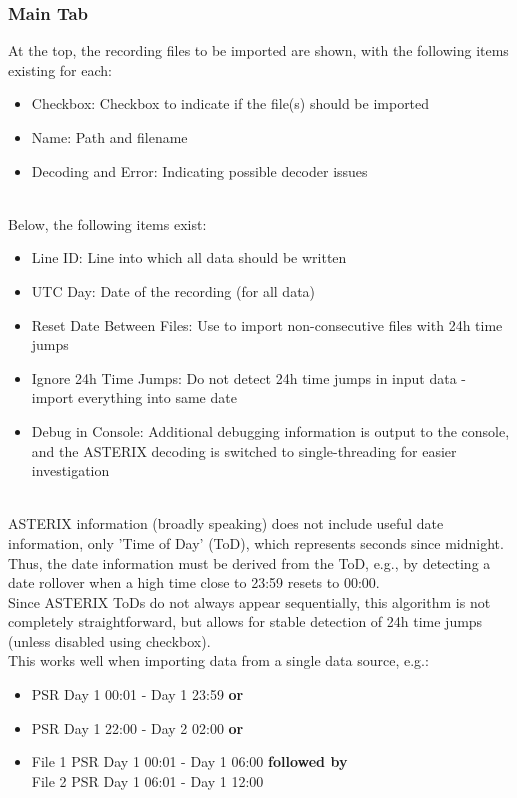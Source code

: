 \subsubsection{Main Tab}

At the top, the recording files to be imported are shown, with the following items existing for each:
\begin{itemize}
\item Checkbox: Checkbox to indicate if the file(s) should be imported
\item Name: Path and filename
\item Decoding and Error: Indicating possible decoder issues
\end{itemize}
\ \\

Below, the following items exist:
\begin{itemize}
\item Line ID: Line into which all data should be written
\item UTC Day: Date of the recording (for all data)
\item Reset Date Between Files: Use to import non-consecutive files with 24h time jumps
\item Ignore 24h Time Jumps: Do not detect 24h time jumps in input data - import everything into same date
\item Debug in Console: Additional debugging information is output to the console, and the ASTERIX decoding is switched to single-threading for easier investigation
\end{itemize}
\ \\

ASTERIX information (broadly speaking) does not include useful date information, only 'Time of Day' (ToD), which represents seconds since midnight. Thus, the date information must be derived from the ToD, e.g., by detecting a date rollover when a high time close to 23:59 resets to 00:00. \\

Since ASTERIX ToDs do not always appear sequentially, this algorithm is not completely straightforward, but allows for stable detection of 24h time jumps (unless disabled using checkbox). \\

This works well when importing data from a single data source, e.g.:
\begin{itemize}
\item PSR Day 1 00:01 - Day 1 23:59 \textbf{or}
\item PSR Day 1 22:00 - Day 2 02:00 \textbf{or}
\item File 1 PSR Day 1 00:01 - Day 1 06:00 \textbf{followed by} \\{} File 2 PSR Day 1 06:01 - Day 1 12:00
\end{itemize}
\ \\

